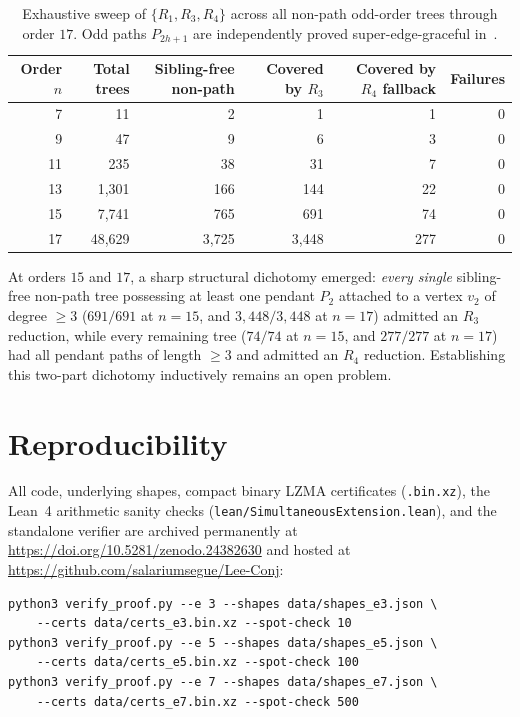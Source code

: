 \documentclass[11pt]{article}
\theoremstyle{definition}
\begin{document}
\begin{table}[h]
\centering
\begin{tabular}{rrrrrr}
\toprule
Order $n$ & Total trees & Sibling-free non-path & Covered by $R_3$ & Covered by $R_4$ fallback & Failures \\
\midrule
7 & 11 & 2 & 1 & 1 & 0 \\
9 & 47 & 9 & 6 & 3 & 0 \\
11 & 235 & 38 & 31 & 7 & 0 \\
13 & 1,301 & 166 & 144 & 22 & 0 \\
15 & 7,741 & 765 & 691 & 74 & 0 \\
17 & 48,629 & 3,725 & 3,448 & 277 & 0 \\
\bottomrule
\end{tabular}
\caption{Exhaustive sweep of $\{R_1, R_3, R_4\}$ across all non-path odd-order trees through order $17$. Odd paths $P_{2h+1}$ are independently proved super-edge-graceful in~\cite{Cichacz2008}.}
\end{table}

At orders $15$ and $17$, a sharp structural dichotomy emerged: \emph{every single} sibling-free non-path tree possessing at least one pendant $P_2$ attached to a vertex $v_2$ of degree $\ge 3$ ($691/691$ at $n=15$, and $3{,}448/3{,}448$ at $n=17$) admitted an $R_3$ reduction, while every remaining tree ($74/74$ at $n=15$, and $277/277$ at $n=17$) had all pendant paths of length $\ge 3$ and admitted an $R_4$ reduction. Establishing this two-part dichotomy inductively remains an open problem.

\section{Reproducibility}

All code, underlying shapes, compact binary LZMA certificates (\texttt{.bin.xz}), the Lean~4 arithmetic sanity checks (\texttt{lean/SimultaneousExtension.lean}), and the standalone verifier are archived permanently at \url{https://doi.org/10.5281/zenodo.24382630} and hosted at \url{https://github.com/salariumsegue/Lee-Conj}:
{\small
\begin{verbatim}
python3 verify_proof.py --e 3 --shapes data/shapes_e3.json \
    --certs data/certs_e3.bin.xz --spot-check 10
python3 verify_proof.py --e 5 --shapes data/shapes_e5.json \
    --certs data/certs_e5.bin.xz --spot-check 100
python3 verify_proof.py --e 7 --shapes data/shapes_e7.json \
    --certs data/certs_e7.bin.xz --spot-check 500
\end{verbatim}
}
\end{document}
